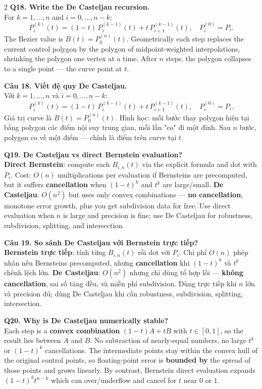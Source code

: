 \begin{paracol}{2}
\textbf{Q18. Write the De Casteljau recursion.}\\
For $k=1,\ldots,n$ and $i=0,\ldots,n-k$:
\[ P_i^{(k)}(t) = (1-t)\, P_i^{(k-1)}(t) + t\, P_{i+1}^{(k-1)}(t), \quad P_i^{(0)}=P_i. \]
The Bezier value is $B(t)=P_0^{(n)}(t)$. Geometrically each step replaces the current control polygon by the polygon of midpoint-weighted interpolations, shrinking the polygon one vertex at a time. After $n$ steps, the polygon collapses to a single point — the curve point at $t$.

\switchcolumn

\textbf{Câu 18. Viết đệ quy De Casteljau.}\\
Với $k=1,\ldots,n$ và $i=0,\ldots,n-k$:
\[ P_i^{(k)}(t) = (1-t)\, P_i^{(k-1)}(t) + t\, P_{i+1}^{(k-1)}(t), \quad P_i^{(0)}=P_i. \]
Giá trị curve là $B(t)=P_0^{(n)}(t)$. Hình học: mỗi bước thay polygon hiện tại bằng polygon các điểm nội suy trung gian, mỗi lần "co" đi một đỉnh. Sau $n$ bước, polygon co về một điểm — chính là điểm trên curve tại $t$.

\switchcolumn*

\textbf{Q19. De Casteljau vs direct Bernstein evaluation?}\\
\textbf{Direct Bernstein}: compute each $B_{i,n}(t)$ via the explicit formula and dot with $P_i$. Cost: $O(n)$ multiplications per evaluation if Bernsteins are precomputed, but it suffers \textbf{cancellation} when $(1-t)^k$ and $t^k$ are large/small. \textbf{De Casteljau}: $O(n^2)$ but uses only convex combinations — \textbf{no cancellation}, monotone error growth, plus you get subdivision data for free. Use direct evaluation when $n$ is large and precision is fine; use De Casteljau for robustness, subdivision, splitting, and intersection.

\switchcolumn

\textbf{Câu 19. So sánh De Casteljau với Bernstein trực tiếp?}\\
\textbf{Bernstein trực tiếp}: tính từng $B_{i,n}(t)$ rồi dot với $P_i$. Chi phí $O(n)$ phép nhân nếu Bernsteins precomputed, nhưng \textbf{cancellation} khi $(1-t)^k$ và $t^k$ chênh lệch lớn. \textbf{De Casteljau}: $O(n^2)$ nhưng chỉ dùng tổ hợp lồi — \textbf{không cancellation}, sai số tăng đều, và miễn phí subdivision. Dùng trực tiếp khi $n$ lớn và precision đủ; dùng De Casteljau khi cần robustness, subdivision, splitting, intersection.

\switchcolumn*

\textbf{Q20. Why is De Casteljau numerically stable?}\\
Each step is a \textbf{convex combination} $(1-t)A + tB$ with $t\in[0,1]$, so the result lies between $A$ and $B$. No subtraction of nearly-equal numbers, no large $t^k$ or $(1-t)^k$ cancellations. The intermediate points stay within the convex hull of the original control points, so floating-point error is \textbf{bounded by} the spread of those points and grows linearly. By contrast, Bernstein direct evaluation expands $(1-t)^k t^{n-k}$ which can over/underflow and cancel for $t$ near $0$ or $1$.


\end{paracol}
